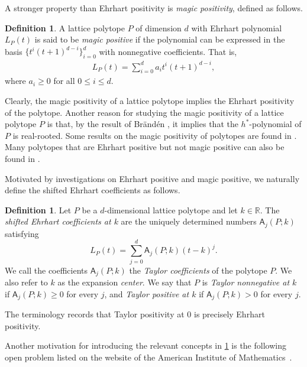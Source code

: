 \documentclass[reqno, 12pt]{article}
\numberwithin{equation}{section}
\theoremstyle{definition}
\newtheorem{definition}[theorem]{Definition}
\newcommand{\R}{\mathbb{R}}
\newcommand{\A}{\mathsf{A}}
\begin{document}
A stronger property than Ehrhart positivity is \emph{magic positivity}, defined as follows.
\begin{definition}
A lattice polytope $P$ of dimension $d$ with Ehrhart polynomial $L_P(t)$ is said to be \emph{magic positive} if the polynomial can be expressed in the basis $\{t^i(t+1)^{d-i}\}_{i=0}^d$ with nonnegative coefficients. That is,
\begin{align*}
L_P(t) = \sum_{i=0}^d a_i t^i(t+1)^{d-i},
\end{align*}
where $a_i \ge 0$ for all $0 \le i \le d$.
\end{definition}

Clearly, the magic positivity of a lattice polytope implies the Ehrhart positivity of the polytope.
Another reason for studying the magic positivity of a lattice polytope $P$ is that, by the result of Br\"and\'en \cite{Branden06}, it implies that the $h^*$-polynomial of $P$ is real-rooted.
Some results on the magic positivity of polytopes are found in \cite{Avila26,Ferroni-Morales2026,LiuZhangMagic,Konoike,HillTrinh}.
Many polytopes that are Ehrhart positive but not magic positive can also be found in \cite{Avila26,FerroniHigashitani2024,LiuZhangMagic}.


Motivated by investigations on Ehrhart positive and magic positive, we naturally define the shifted Ehrhart coefficients as follows.

\begin{definition}\label{def:taylor-positive}
Let $P$ be a $d$-dimensional lattice polytope and let $k\in\R$.  The \emph{shifted Ehrhart coefficients at $k$} are the uniquely determined numbers $\A_j(P;k)$ satisfying
\begin{equation}\label{eq:shifted-expansion}
L_P(t)=\sum_{j=0}^{d}\A_j(P;k)(t-k)^j.
\end{equation}
We call the coefficients $\A_j(P;k)$ the \emph{Taylor coefficients} of the polytope $P$. We also refer to $k$ as the expansion \emph{center}. We say that $P$ is \emph{Taylor nonnegative at $k$} if $\A_j(P;k)\geq0$ for every $j$, and \emph{Taylor positive at $k$} if $\A_j(P;k)>0$ for every $j$.
\end{definition}

The terminology records that Taylor positivity at $0$ is precisely Ehrhart positivity.  


Another motivation for introducing the relevant concepts in \cref{def:taylor-positive} is the following open problem listed on the website of the American Institute of Mathematics~\cite{AimPl-Website}.
\end{document}
